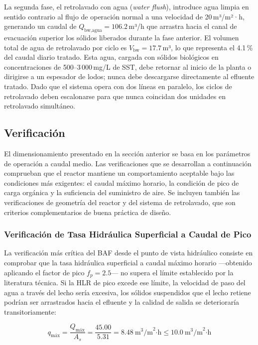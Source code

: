 La segunda fase, el retrolavado con agua (\textit{water flush}), introduce agua limpia en sentido contrario al flujo de operación normal a una velocidad de 20\,m³/m²·h, generando un caudal de $Q_{\text{bw,agua}} = 106.2$\,m³/h que arrastra hacia el canal de evacuación superior los sólidos liberados durante la fase anterior. El volumen total de agua de retrolavado por ciclo es $V_{\text{bw}} = 17.7$\,m³, lo que representa el 4.1\,\% del caudal diario tratado. Esta agua, cargada con sólidos biológicos en concentraciones de 500--3\,000\,mg/L de SST, debe retornar al inicio de la planta o dirigirse a un espesador de lodos; nunca debe descargarse directamente al efluente tratado. Dado que el sistema opera con dos líneas en paralelo, los ciclos de retrolavado deben escalonarse para que nunca coincidan dos unidades en retrolavado simultáneo.

\subsection{Verificación}

El dimensionamiento presentado en la sección anterior se basa en los parámetros de operación a caudal medio. Las verificaciones que se desarrollan a continuación comprueban que el reactor mantiene un comportamiento aceptable bajo las condiciones más exigentes: el caudal máximo horario, la condición de pico de carga orgánica y la suficiencia del suministro de aire. Se incluyen también las verificaciones de geometría del reactor y del sistema de retrolavado, que son criterios complementarios de buena práctica de diseño.

\subsubsection*{Verificación de Tasa Hidráulica Superficial a Caudal de Pico}

La verificación más crítica del BAF desde el punto de vista hidráulico consiste en comprobar que la tasa hidráulica superficial a caudal máximo horario —obtenido aplicando el factor de pico $f_p = 2.5$— no supera el límite establecido por la literatura técnica. Si la HLR de pico excede ese límite, la velocidad de paso del agua a través del lecho sería excesiva, los sólidos suspendidos que el lecho retiene podrían ser arrastrados hacia el efluente y la calidad de salida se deterioraría transitoriamente:

\begin{equation}
q_{\text{máx}} = \frac{Q_{\text{máx}}}{A_{s}} = \frac{45.00}{5.31} = 8.48\ \text{m}^3\text{/m}^2\text{·h} \leq 10.0\ \text{m}^3\text{/m}^2\text{·h}
\end{equation}

